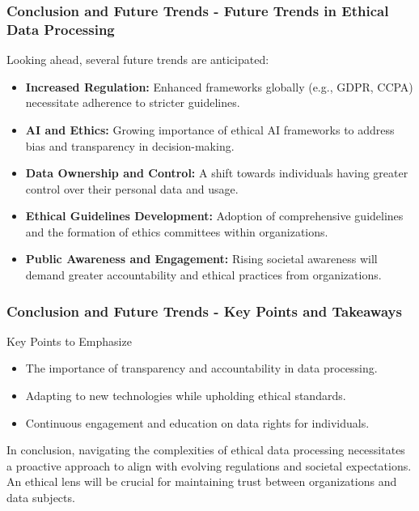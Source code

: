 \documentclass{beamer}
\begin{document}
\begin{frame}[fragile]
    \frametitle{Conclusion and Future Trends - Future Trends in Ethical Data Processing}
    Looking ahead, several future trends are anticipated:
    \begin{itemize}
        \item \textbf{Increased Regulation:} 
        Enhanced frameworks globally (e.g., GDPR, CCPA) necessitate adherence to stricter guidelines.

        \item \textbf{AI and Ethics:} 
        Growing importance of ethical AI frameworks to address bias and transparency in decision-making.

        \item \textbf{Data Ownership and Control:} 
        A shift towards individuals having greater control over their personal data and usage.

        \item \textbf{Ethical Guidelines Development:} 
        Adoption of comprehensive guidelines and the formation of ethics committees within organizations.

        \item \textbf{Public Awareness and Engagement:} 
        Rising societal awareness will demand greater accountability and ethical practices from organizations.
    \end{itemize}
\end{frame}

\begin{frame}[fragile]
    \frametitle{Conclusion and Future Trends - Key Points and Takeaways}
    \begin{block}{Key Points to Emphasize}
        \begin{itemize}
            \item The importance of transparency and accountability in data processing.
            \item Adapting to new technologies while upholding ethical standards.
            \item Continuous engagement and education on data rights for individuals.
        \end{itemize}
    \end{block}
    
    In conclusion, navigating the complexities of ethical data processing necessitates a proactive approach to align with evolving regulations and societal expectations. An ethical lens will be crucial for maintaining trust between organizations and data subjects.
\end{frame}
\end{document}
